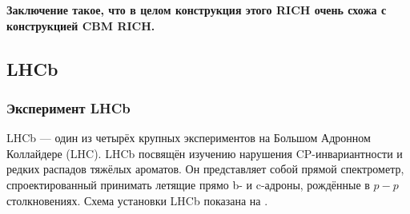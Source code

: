 
\textbf{Заключение такое, что в целом конструкция этого RICH очень схожа с конструкцией CBM RICH.}




\subsection{LHCb}\label{sec:LHCb}



\subsubsection{Эксперимент LHCb}

LHCb --- один из четырёх крупных экспериментов на Большом Адронном Коллайдере (LHC). LHCb посвящён изучению нарушения CP-инвариантности и редких распадов тяжёлых ароматов. Он представляет собой прямой спектрометр, спроектированный принимать летящие прямо b- и c-адроны, рождённые в $p-p$ столкновениях. Схема установки LHCb показана на .

